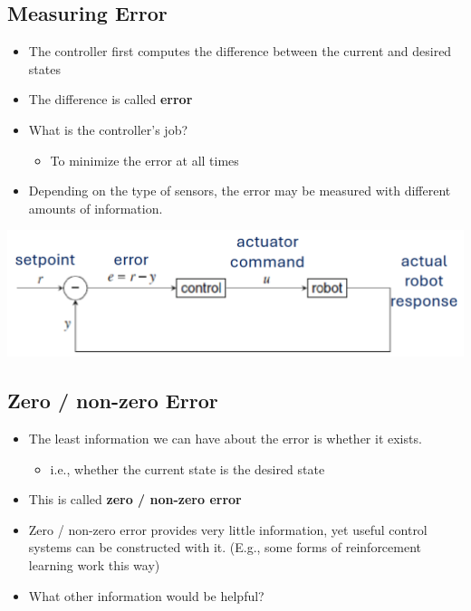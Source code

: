 \documentclass[10pt]{article}
\begin{document}
\subsection*{Measuring Error}
\begin{itemize}
	\item The controller first computes the difference between the current and desired states
	\item The difference is called \textbf{error}
	\item What is the controller's job?
	\begin{itemize}
        \item To minimize the error at all times
    \end{itemize}
    \item Depending on the type of sensors, the error may be measured with different amounts of information.
\end{itemize}
\begin{center} 
	\includegraphics*[width=\textwidth]{L2_6.png} 
\end{center}
\subsection*{Zero / non-zero Error}
\begin{itemize}
	\item The least information we can have about the error is whether it exists.
	\begin{itemize}
        \item i.e., whether the current state is the desired state
    \end{itemize}
    \item This is called \textbf{zero / non-zero error}
    \item Zero / non-zero error provides very little information, yet useful control systems can be constructed with it.  (E.g., some forms of reinforcement learning work this way)
    \item What other information would be helpful?
\end{itemize}
\end{document}
